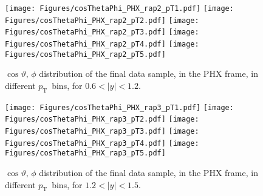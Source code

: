 \documentclass[12pt]{article}
\newcommand{\pt}{$p_{\mathrm{T}}$}
\begin{document}
\begin{figure}[htbp]
\centering
\texttt{[image: Figures/cosThetaPhi\_PHX\_rap2\_pT1.pdf]}
\texttt{[image: Figures/cosThetaPhi\_PHX\_rap2\_pT2.pdf]}
\texttt{[image: Figures/cosThetaPhi\_PHX\_rap2\_pT3.pdf]}
\texttt{[image: Figures/cosThetaPhi\_PHX\_rap2\_pT4.pdf]}
\texttt{[image: Figures/cosThetaPhi\_PHX\_rap2\_pT5.pdf]}
\caption{$\cos\vartheta,\,\phi$ distribution of the final data sample, 
	in the PHX frame, in different \pt\ bins, for $0.6 < |y| < 1.2$.}
\end{figure}
\clearpage

\begin{figure}[htbp]
\centering
\texttt{[image: Figures/cosThetaPhi\_PHX\_rap3\_pT1.pdf]}
\texttt{[image: Figures/cosThetaPhi\_PHX\_rap3\_pT2.pdf]}
\texttt{[image: Figures/cosThetaPhi\_PHX\_rap3\_pT3.pdf]}
\texttt{[image: Figures/cosThetaPhi\_PHX\_rap3\_pT4.pdf]}
\texttt{[image: Figures/cosThetaPhi\_PHX\_rap3\_pT5.pdf]}
\caption{$\cos\vartheta,\,\phi$ distribution of the final data sample, 
	in the PHX frame, in different \pt\ bins, for $1.2 < |y| < 1.5$.}
\end{figure}
\clearpage
\end{document}
